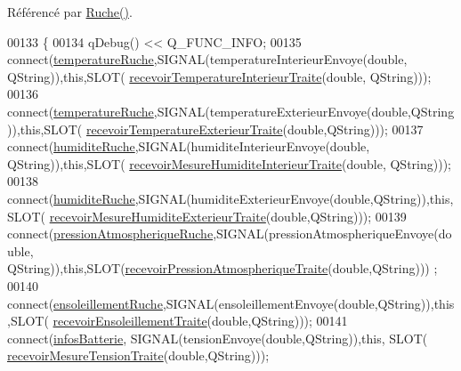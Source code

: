 Référencé par \hyperlink{class_ruche_a8b4ee3752d984c5acee93b990db7939a}{Ruche()}.


\begin{DoxyCode}
00133 \{
00134     qDebug() << Q\_FUNC\_INFO;
00135     connect(\hyperlink{class_ruche_af721fb92f801a9b1f3ef3aa9867cf3de}{temperatureRuche},SIGNAL(temperatureInterieurEnvoye(\textcolor{keywordtype}{double}, QString)),\textcolor{keyword}{this},SLOT(
      \hyperlink{class_ruche_a3a5934e6da843c959f34aecef1217f92}{recevoirTemperatureInterieurTraite}(\textcolor{keywordtype}{double}, QString)));
00136     connect(\hyperlink{class_ruche_af721fb92f801a9b1f3ef3aa9867cf3de}{temperatureRuche},SIGNAL(temperatureExterieurEnvoye(\textcolor{keywordtype}{double},QString)),\textcolor{keyword}{this},SLOT(
      \hyperlink{class_ruche_a1d9b1d3aad20f206f27de4093b4a136f}{recevoirTemperatureExterieurTraite}(\textcolor{keywordtype}{double},QString)));
00137     connect(\hyperlink{class_ruche_acb380928928e693a1933c4cf607ddf80}{humiditeRuche},SIGNAL(humiditeInterieurEnvoye(\textcolor{keywordtype}{double}, QString)),\textcolor{keyword}{this},SLOT(
      \hyperlink{class_ruche_aab8b4958b32aad9af790963903e4788e}{recevoirMesureHumiditeInterieurTraite}(\textcolor{keywordtype}{double}, QString)));
00138     connect(\hyperlink{class_ruche_acb380928928e693a1933c4cf607ddf80}{humiditeRuche},SIGNAL(humiditeExterieurEnvoye(\textcolor{keywordtype}{double},QString)),\textcolor{keyword}{this},SLOT(
      \hyperlink{class_ruche_a2d19d8438eae55c1d76691398087f079}{recevoirMesureHumiditeExterieurTraite}(\textcolor{keywordtype}{double},QString)));
00139     connect(\hyperlink{class_ruche_a06efa82900dc7e31ed67c826d3157ae0}{pressionAtmospheriqueRuche},SIGNAL(pressionAtmospheriqueEnvoye(\textcolor{keywordtype}{double},
      QString)),\textcolor{keyword}{this},SLOT(\hyperlink{class_ruche_a3b43ce547e616ee0b14e3a0e0aa44a4d}{recevoirPressionAtmospheriqueTraite}(\textcolor{keywordtype}{double},QString)))
      ;
00140     connect(\hyperlink{class_ruche_a197003ecff4f029885c7d38569a68d49}{ensoleillementRuche},SIGNAL(ensoleillementEnvoye(\textcolor{keywordtype}{double},QString)),\textcolor{keyword}{this},SLOT(
      \hyperlink{class_ruche_a581320fbd44c1752d10aa0e6e533863c}{recevoirEnsoleillementTraite}(\textcolor{keywordtype}{double},QString)));
00141     connect(\hyperlink{class_ruche_af34340e456aff54c8d1ec433fdbe0740}{infosBatterie}, SIGNAL(tensionEnvoye(\textcolor{keywordtype}{double},QString)),\textcolor{keyword}{this}, SLOT(
      \hyperlink{class_ruche_a65782ea2ee63003f2eae45e2530e3d5b}{recevoirMesureTensionTraite}(\textcolor{keywordtype}{double},QString)));

\end{DoxyCode}
